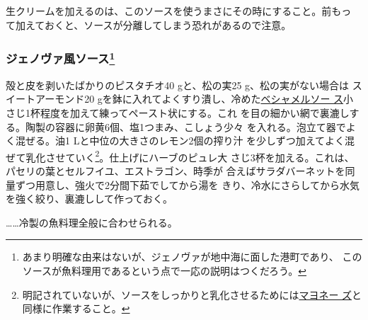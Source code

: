 \begin{recette}
生クリームを加えるのは、このソースを使うまさにその時にすること。前もっ
て加えておくと、ソースが分離してしまう恐れがあるので注意。

\hypertarget{sauce-genoise-froids}{%
\subsubsection[ジェノヴァ風ソース]{\texorpdfstring{ジェノヴァ風ソース\footnote{あまり明確な由来はないが、ジェノヴァが地中海に面した港町であり、
  このソースが魚料理用であるという点で一応の説明はつくだろう。}}{ジェノヴァ風ソース}}\label{sauce-genoise-froids}}



殻と皮を剥いたばかりのピスタチオ40 gと、松の実25 g、松の実がない場合は
スイートアーモンド20
gを鉢に入れてよくすり潰し、冷めた\protect\hyperlink{sauce-bechamel}{ベシャメルソー
ス}小さじ1杯程度を加えて練ってペースト状にする。これ
を目の細かい網で裏漉しする。陶製の容器に卵黄6個、塩1つまみ、こしょう少々
を入れる。泡立て器でよく混ぜる。油1 Lと中位の大きさのレモン2個の搾り汁
を少しずつ加えてよく混ぜて乳化させていく\footnote{明記されていないが、ソースをしっかりと乳化させるためには\protect\hyperlink{mayonnaise}{マヨネー
  ズ}と同様に作業すること。}。仕上げにハーブのピュレ大
さじ3杯を加える。これは、パセリの葉とセルフイユ、エストラゴン、時季が
合えばサラダバーネットを同量ずつ用意し、強火で2分間下茹でしてから湯を
きり、冷水にさらしてから水気を強く絞り、裏漉しして作っておく。

\ldots{}\ldots{}冷製の魚料理全般に合わせられる。

\hypertarget{sauce-gribiche}{%
}
\end{recette}
